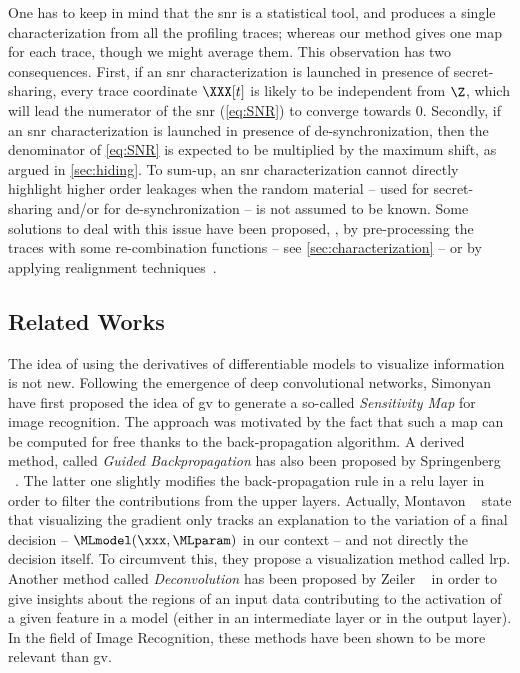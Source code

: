 One has to keep in mind that the \gls{snr} is a statistical tool, and produces a single characterization from all the profiling traces; whereas our method gives one map for each trace, though we might average them.
This observation has two consequences.
First, if an \gls{snr} characterization is launched in presence of secret-sharing, every trace coordinate \(\XXX[t]\) is likely to be independent from \(\Z\), which will lead the numerator of the \gls{snr} (\autoref{eq:SNR}) to converge towards \(0\).
Secondly, if an \gls{snr} characterization is launched in presence of de-synchronization, then the denominator of \autoref{eq:SNR} is expected to be multiplied by the maximum shift, as argued in \autoref{sec:hiding}.
To sum-up, an \gls{snr} characterization cannot directly highlight higher order leakages when the random material -- used for secret-sharing and/or for de-synchronization -- is not assumed to be known.
Some solutions to deal with this issue have been proposed, \eg{}, by pre-processing the traces with some re-combination functions -- see \autoref{sec:characterization} -- or by applying realignment techniques~\cite{van_woudenberg_improving_2011,nagashima_dpa_2007,durvaux_efficient_2012}.


\subsection{Related Works}
\label{sec:biblio_cosade}
The idea of using the derivatives of differentiable models to visualize information is not new. 
Following the emergence of deep convolutional networks, Simonyan \etal~\cite{simonyan_deep_2013} have first proposed the idea of \gls{gv} to generate a so-called \emph{Sensitivity Map} for image recognition.
The approach was motivated by the fact that such a map can be computed for free thanks to the back-propagation algorithm.
A derived method, called \emph{Guided Backpropagation} has also been proposed by Springenberg \etal{}~\cite{springenberg_striving_2014}.
The latter one slightly modifies the back-propagation rule in a \gls{relu} layer in order to filter the contributions from the upper layers.
Actually, Montavon \etal{}~\cite{montavon_methods_2018} state that visualizing the gradient only tracks an explanation to the variation of a final decision -- \(\MLmodel(\xxx, \MLparam)\) in our context -- and
not directly the decision itself.
To circumvent this, they propose a visualization method called \gls{lrp}.
Another method called \emph{Deconvolution} has been proposed by Zeiler \etal{}~\cite{zeiler_visualizing_2013} in order to give insights about the regions of an input data contributing to the activation of a given feature in a model (either in an intermediate layer or in the output layer).
In the field of Image Recognition, these methods have been shown to be more relevant than \gls{gv}.

